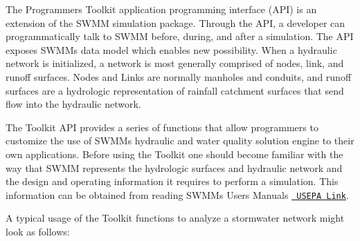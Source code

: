 The Programmer\textquotesingle{}s Toolkit application programming interface (A\+PI) is an extension of the S\+W\+MM simulation package. Through the A\+PI, a developer can programmatically talk to S\+W\+MM before, during, and after a simulation. The A\+PI exposes S\+W\+MM\textquotesingle{}s data model which enables new possibility. When a hydraulic network is initialized, a network is most generally comprised of nodes, link, and runoff surfaces. Nodes and Links are normally manholes and conduits, and runoff surfaces are a hydrologic representation of rainfall catchment surfaces that send flow into the hydraulic network.

The Toolkit A\+PI provides a series of functions that allow programmers to customize the use of S\+W\+MM\textquotesingle{}s hydraulic and water quality solution engine to their own applications. Before using the Toolkit one should become familiar with the way that S\+W\+MM represents the hydrologic surfaces and hydraulic network and the design and operating information it requires to perform a simulation. This information can be obtained from reading S\+W\+MM\textquotesingle{}s Users Manuals \href{https://www.epa.gov/water-research/storm-water-management-model-swmm}{\texttt{ U\+S\+E\+PA Link}}.

A typical usage of the Toolkit functions to analyze a stormwater network might look as follows\+:


